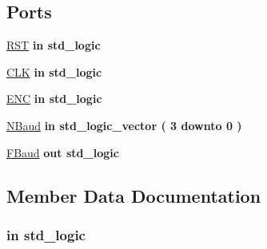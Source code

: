 \subsection*{Ports}
 \begin{DoxyCompactItemize}
\item 
\hyperlink{class_baud_rate_r_d_a98682ef7de2714e5bab788a2e2ff1b7f}{R\+S\+T}  {\bfseries {\bfseries \textcolor{keywordflow}{in}\textcolor{vhdlchar}{ }}} {\bfseries \textcolor{comment}{std\+\_\+logic}\textcolor{vhdlchar}{ }} 
\item 
\hyperlink{class_baud_rate_r_d_ab5d0ea9e968d49d94da9db07a979d402}{C\+L\+K}  {\bfseries {\bfseries \textcolor{keywordflow}{in}\textcolor{vhdlchar}{ }}} {\bfseries \textcolor{comment}{std\+\_\+logic}\textcolor{vhdlchar}{ }} 
\item 
\hyperlink{class_baud_rate_r_d_aa4e343f8d239d8a1a2c1bf5b3a6422bc}{E\+N\+C}  {\bfseries {\bfseries \textcolor{keywordflow}{in}\textcolor{vhdlchar}{ }}} {\bfseries \textcolor{comment}{std\+\_\+logic}\textcolor{vhdlchar}{ }} 
\item 
\hyperlink{class_baud_rate_r_d_af99e9846fb1525d8781a8861c5405ac6}{N\+Baud}  {\bfseries {\bfseries \textcolor{keywordflow}{in}\textcolor{vhdlchar}{ }}} {\bfseries \textcolor{comment}{std\+\_\+logic\+\_\+vector}\textcolor{vhdlchar}{ }\textcolor{vhdlchar}{(}\textcolor{vhdlchar}{ }\textcolor{vhdlchar}{ } \textcolor{vhdldigit}{3} \textcolor{vhdlchar}{ }\textcolor{keywordflow}{downto}\textcolor{vhdlchar}{ }\textcolor{vhdlchar}{ } \textcolor{vhdldigit}{0} \textcolor{vhdlchar}{ }\textcolor{vhdlchar}{)}\textcolor{vhdlchar}{ }} 
\item 
\hyperlink{class_baud_rate_r_d_a624b7278be72c706bd13baf72645915f}{F\+Baud}  {\bfseries {\bfseries \textcolor{keywordflow}{out}\textcolor{vhdlchar}{ }}} {\bfseries \textcolor{comment}{std\+\_\+logic}\textcolor{vhdlchar}{ }} 
\end{DoxyCompactItemize}


\subsection{Member Data Documentation}
\hypertarget{class_baud_rate_r_d_ab5d0ea9e968d49d94da9db07a979d402}{}
\subsubsection[{C\+L\+K}]{ {\bfseries \textcolor{keywordflow}{in}\textcolor{vhdlchar}{ }} {\bfseries \textcolor{comment}{std\+\_\+logic}\textcolor{vhdlchar}{ }} \hspace{0.3cm}{\ttfamily [Port]}}\label{class_baud_rate_r_d_ab5d0ea9e968d49d94da9db07a979d402}
\hypertarget{class_baud_rate_r_d_aa4e343f8d239d8a1a2c1bf5b3a6422bc}{}
